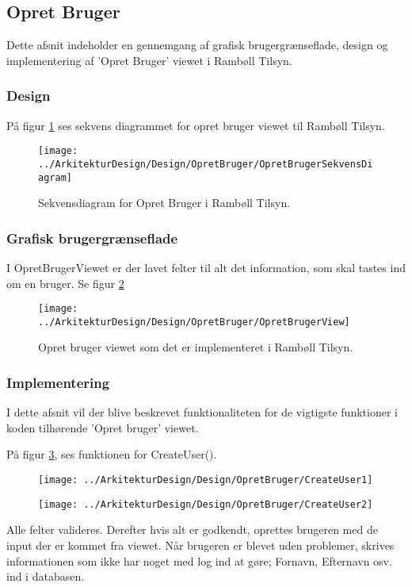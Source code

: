 \subsection{Opret Bruger}\label{sec:Opretbruger}
Dette afsnit indeholder en gennemgang af grafisk brugergrænseflade, design og implementering af 'Opret Bruger' viewet i Rambøll Tilsyn.

\subsubsection{Design}
På figur \ref{fig:OpretBrugerSekvens} ses sekvens diagrammet for opret bruger viewet til Rambøll Tilsyn.
\begin{figure}[H] %
	\centering
	\texttt{[image: ../ArkitekturDesign/Design/OpretBruger/OpretBrugerSekvensDiagram]}
	\caption{Sekvensdiagram for Opret Bruger i Rambøll Tilsyn.}
	\label{fig:OpretBrugerSekvens}
\end{figure}

\subsubsection{Grafisk brugergrænseflade}
I OpretBrugerViewet er der lavet felter til alt det information, som skal tastes ind om en bruger. Se figur \ref{fig:OpretBrugerView}
\begin{figure}[H] %
	\centering
	\texttt{[image: ../ArkitekturDesign/Design/OpretBruger/OpretBrugerView]}
	\caption{Opret bruger viewet som det er implementeret i Rambøll Tilsyn.}
	\label{fig:OpretBrugerView}
\end{figure}

\clearpage

\subsubsection{Implementering}
I dette afsnit vil der blive beskrevet funktionaliteten for de vigtigste funktioner i koden tilhørende 'Opret bruger' viewet.

På figur \ref{fig:CreateUser}, ses funktionen for CreateUser().
\begin{figure}[H] %
	\centering
	\texttt{[image: ../ArkitekturDesign/Design/OpretBruger/CreateUser1]}
\end{figure}
\begin{figure}[H] %
	\centering
	\texttt{[image: ../ArkitekturDesign/Design/OpretBruger/CreateUser2]}
	\caption{}
	\label{fig:CreateUser}
\end{figure}
Alle felter valideres. Derefter hvis alt er godkendt, oprettes brugeren med de input der er kommet fra viewet. Når brugeren er blevet uden problemer, skrives informationen som ikke har noget med log ind at gøre; Fornavn, Efternavn osv. ind i databasen.

\clearpage